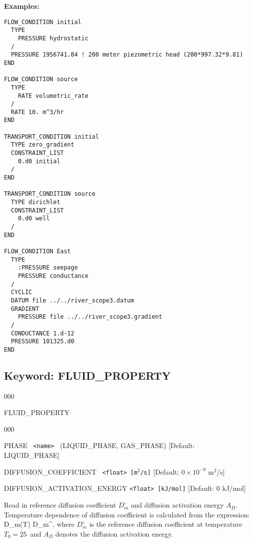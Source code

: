 \bigskip

\begin{mdframed}

{\noindent\bf Examples:}
\begin{verbatim}
FLOW_CONDITION initial
  TYPE
    PRESSURE hydrostatic
  /
  PRESSURE 1956741.84 ! 200 meter piezometric head (200*997.32*9.81)
END

FLOW_CONDITION source
  TYPE
    RATE volumetric_rate
  /
  RATE 10. m^3/hr
END

TRANSPORT_CONDITION initial
  TYPE zero_gradient
  CONSTRAINT_LIST
    0.d0 initial
  /
END

TRANSPORT_CONDITION source
  TYPE dirichlet
  CONSTRAINT_LIST
    0.d0 well
  /
END

FLOW_CONDITION East
  TYPE
    :PRESSURE seepage
    PRESSURE conductance
  /
  CYCLIC
  DATUM file ../../river_scope3.datum
  GRADIENT
    PRESSURE file ../../river_scope3.gradient
  /
  CONDUCTANCE 1.d-12
  PRESSURE 101325.d0
END
\end{verbatim}
\end{mdframed}

\hyperlink{target_key}{\return}


\newpage
\protect\hypertarget{target_fluid_property}{}

\subsection{Keyword: FLUID\_PROPERTY}


\begin{deflist}{000}
\item[FLUID\_PROPERTY]~
\begin{deflist}{000}
\item[PHASE] \ {\tt <name>} \ (LIQUID\_PHASE, GAS\_PHASE) [Default: LIQUID\_PHASE]
\item[DIFFUSION\_COEFFICIENT] \ {\tt <float> [m$^2$/s]} [Default: $0\times 10^{-9}$ m$^2$/s]
\item[DIFFUSION\_ACTIVATION\_ENERGY] {\tt <float> [kJ/mol]} [Default: 0 kJ/mol]
\end{deflist}
\item[\keyend]
\end{deflist}

 Read in reference diffusion coefficient $D_m^\circ$ and diffusion activation energy $A_D$. Temperature dependence of diffusion coefficient is calculated from the expression:
\EQ
D_m(T) \eq D_m^\circ\exp{},
\EN
where $D_m^\circ$ is the reference diffusion coefficient at temperature $T_0 = 25$\degc\ and $A_D$ denotes the diffusion activation energy.

